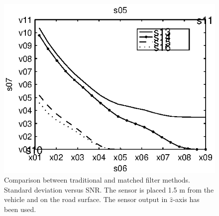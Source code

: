 \begin{subfigures}
\begin{figure}[!tbhf]
\begin{minipage}{0.45\linewidth}
   \includegraphics[width=\linewidth]{images/std_error_z}
  \caption[Time difference, method comparison. Error standard deviation.  $\hat{z}$-axis]{Comparison between traditional and matched filter methods. Standard deviation versus SNR. The sensor is placed 1.5 m from the vehicle and on the road surface. The sensor output in $\hat{z}$-axis has been used.}
  \label{fig:comp_std_z}
  \end{minipage}
 \end{figure}
\end{subfigures}

